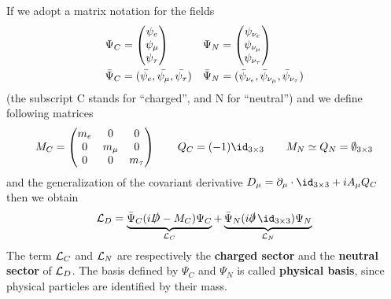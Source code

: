 \documentclass[TheoreticalPhy_ModB.tex]{subfiles}
\begin{document}
If we adopt a matrix notation for the fields
\begin{align}
\Psi_C & =
\begin{pmatrix}
\psi_e \\
\psi_{\mu} \\
\psi_{\tau}
\end{pmatrix}
&
\Psi_N & =
\begin{pmatrix}
\psi_{\nu_e} \\
\psi_{\nu_{\mu}} \\
\psi_{\nu_{\tau}}
\end{pmatrix}
\notag \\
\bar{\Psi}_C & = (\bar{\psi_e}, \bar{\psi_{\mu}}, \bar{\psi_{\tau}})
&
\bar{\Psi}_N & = (\bar{\psi}_{\nu_e}, \bar{\psi}_{\nu_{\mu}}, \bar{\psi}_{\nu_{\tau}})
\notag 
\end{align}
(the subscript C stands for ``charged'', and N for ``neutral'') and we define following matrices
\[
M_C =
\begin{pmatrix}
m_e 	& 0 			& 0 \\
0	& m_{\mu}	& 0 \\
0	& 0			& m_{\tau}
\end{pmatrix}
\qquad
Q_C = (-1) \id_{3 \times 3}
\qquad
M_N \simeq Q_N = \emptyset_{3 \times 3}
\]
and the generalization of the covariant derivative $D_{\mu} = \partial_{\mu} \cdot \id_{3 \times 3} + iA_{\mu}Q_C$ then we obtain
\[
\mathL_D = \underbrace{\bar{\Psi}_C (i \slashed D - M_C)\Psi_C}_{\mathL_C} +
	\underbrace{\bar{\Psi}_N(i \slashed \partial \,\id_{3 \times 3})\Psi_N}_{\mathL_N}
\]
The term $\mathcal{L}_C$ and $\mathcal{L}_N$ are respectively the \textbf{charged sector} and the \textbf{neutral sector} of $\mathcal{L}_D$.
The basis defined by $\Psi_C$ and $\Psi_N$ is called \textbf{physical basis}, since physical particles are identified by their mass.
\end{document}

